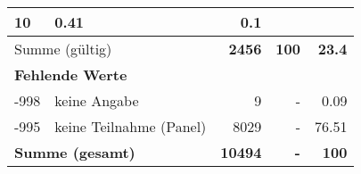 \begin{longtable}{lXrrr}
       \num{10} &
       \num[round-mode=places,round-precision=2]{0,41} &
         \num[round-mode=places,round-precision=2]{0,1} \\
     \midrule
     \multicolumn{2}{l}{Summe (gültig)} &
       \textbf{\num{2456}} &
     \textbf{100} &
       \textbf{\num[round-mode=places,round-precision=2]{23,4}} \\
     \multicolumn{5}{l}{\textbf{Fehlende Werte}}\\
       -998 &
       keine Angabe &
         \num{9} &
        - &
         \num[round-mode=places,round-precision=2]{0,09} \\
       -995 &
       keine Teilnahme (Panel) &
         \num{8029} &
        - &
         \num[round-mode=places,round-precision=2]{76,51} \\
     \midrule
     \multicolumn{2}{l}{\textbf{Summe (gesamt)}} &
          \textbf{\num{10494}} &
        \textbf{-} &
        \textbf{100} \\
     \bottomrule
     \end{longtable}
     
